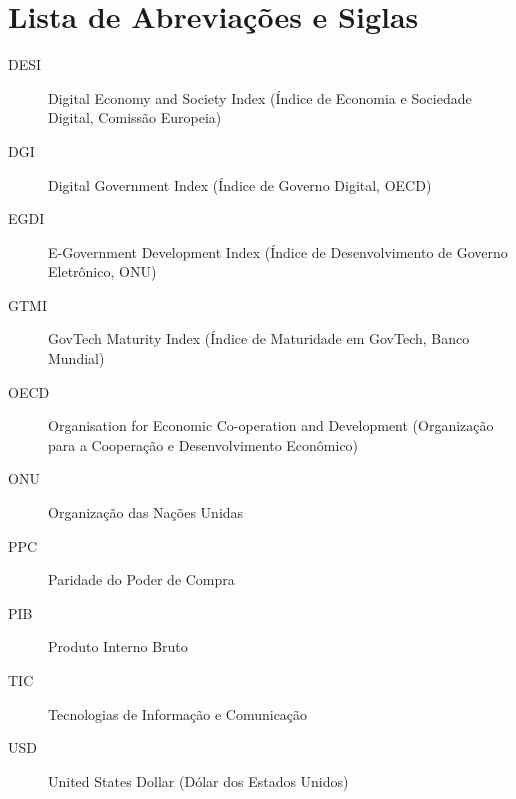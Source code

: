 \chapter*{Lista de Abreviações e Siglas}

\begin{description}
    \item[DESI] Digital Economy and Society Index (Índice de Economia e Sociedade Digital, Comissão Europeia)
    \item[DGI] Digital Government Index (Índice de Governo Digital, OECD)
    \item[EGDI] E-Government Development Index (Índice de Desenvolvimento de Governo Eletrônico, ONU)
    \item[GTMI] GovTech Maturity Index (Índice de Maturidade em GovTech, Banco Mundial)
    \item[OECD] Organisation for Economic Co-operation and Development (Organização para a Cooperação e Desenvolvimento Econômico)
    \item[ONU] Organização das Nações Unidas
    \item[PPC] Paridade do Poder de Compra
    \item[PIB] Produto Interno Bruto
    \item[TIC] Tecnologias de Informação e Comunicação
    \item[USD] United States Dollar (Dólar dos Estados Unidos)
\end{description}